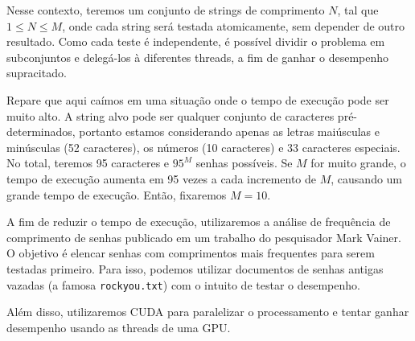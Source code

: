 \documentclass[12pt, a4paper]{article}
\begin{document}
Nesse contexto, teremos um conjunto de strings de comprimento $N$, tal que $1 \leq N \leq M$, onde cada string será testada atomicamente, sem depender de outro resultado. Como cada teste é independente, é possível dividir o problema em subconjuntos e delegá-los à diferentes threads, a fim de ganhar o desempenho supracitado.

Repare que aqui caímos em uma situação onde o tempo de execução pode ser muito alto. A string alvo pode ser qualquer conjunto de caracteres pré-determinados, portanto estamos considerando apenas as letras maiúsculas e minúsculas (52 caracteres), os números (10 caracteres) e 33 caracteres especiais. No total, teremos 95 caracteres e $95^{M}$ senhas possíveis. Se $M$ for muito grande, o tempo de execução aumenta em 95 vezes a cada incremento de $M$, causando um grande tempo de execução. Então, fixaremos $M=10$.

A fim de reduzir o tempo de execução, utilizaremos a análise de frequência de comprimento de senhas publicado em um trabalho do pesquisador Mark Vainer. O objetivo é elencar senhas com comprimentos mais frequentes para serem testadas primeiro. Para isso, podemos utilizar documentos de senhas antigas vazadas (a famosa \texttt{rockyou.txt}) com o intuito de testar o desempenho.

Além disso, utilizaremos CUDA para paralelizar o processamento e tentar ganhar desempenho usando as threads de uma GPU.
\end{document}
